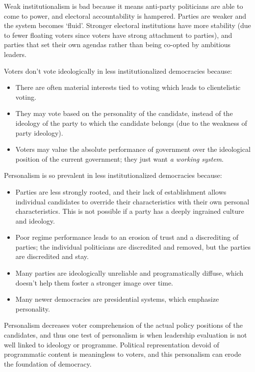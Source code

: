 Weak institutionalism is bad because it means anti-party politicians
are able to come to power, and electoral accountability is
hampered. Parties are weaker and the system becomes `fluid'. Stronger
electoral institutions have more stability (due to fewer floating
voters since voters have strong attachment to parties), and parties
that set their own agendas rather than being co-opted by ambitious
leaders.


Voters don't vote ideologically in less institutionalized democracies
because:
\begin{itemize}
  \item There are often material interests tied to voting which leads to
    clientelistic voting.
  \item They may vote based on the personality of the candidate,
    instead of the ideology of the party to which the candidate
    belongs (due to the weakness of party ideology).
  \item Voters may value the absolute performance of government over
    the ideological position of the current government; they just want
    \textit{a working system}.
\end{itemize}


Personalism is so prevalent in less institutionalized democracies
because:
\begin{itemize}
  \item Parties are less strongly rooted, and their lack of
    establishment allows individual candidates to override their
    characteristics with their own personal characteristics. This is not
    possible if a party has a deeply ingrained culture and ideology.
  \item Poor regime performance leads to an erosion of trust and a
    discrediting of parties; the individual politicians are
    discredited and removed, but the parties are discredited and stay.
  \item Many parties are ideologically unreliable and programatically
    diffuse, which doesn't help them foster a stronger image over
    time.
  \item Many newer democracies are presidential systems, which
    emphasize personality.
\end{itemize}

Personalism decreases voter comprehension of the actual policy
positions of the candidates, and thus one test of personalism is when
leadership evaluation is not well linked to ideology or
programme. Political representation devoid of programmatic content is
meaningless to voters, and this personalism can erode the foundation
of democracy.

